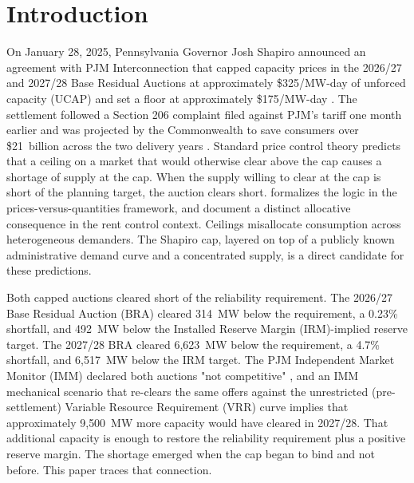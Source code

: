 
\section{Introduction}
\label{sec:introduction}

On January 28, 2025, Pennsylvania Governor Josh Shapiro announced an
agreement with PJM Interconnection that capped capacity prices in the
2026/27 and 2027/28 Base Residual Auctions at approximately
\$325/MW-day of unforced capacity (UCAP) and set a floor at
approximately \$175/MW-day \citep{Shapiro2025_press_release,
PJM2025_settlement_slides}. The settlement followed a Section 206
complaint filed against PJM's tariff one month earlier
\citep{PJM2025_settlement_slides} and was projected by the
Commonwealth to save consumers over \$21~billion across the two
delivery years \citep{Shapiro2025_press_release}. Standard price control theory predicts that a
ceiling on a market that would otherwise clear above the cap
causes a shortage of supply at the cap. When the supply willing to clear at the
cap is short of the planning target, the auction clears short.
\citet{Weitzman1974_prices} formalizes the logic in the
prices-versus-quantities framework, and
\citet{GlaeserLuttmer2003_rent} document a distinct allocative
consequence in the rent control context. Ceilings misallocate
consumption across heterogeneous demanders. The Shapiro cap,
layered on top of a publicly known administrative demand curve and a
concentrated supply, is a direct candidate for these predictions.

Both capped auctions cleared short of the reliability requirement.
The 2026/27 Base Residual Auction (BRA) cleared 314~MW below the
requirement, a 0.23\% shortfall, and 492~MW below the
Installed Reserve Margin (IRM)-implied reserve target. The
2027/28 BRA cleared 6{,}623~MW below the requirement, a 4.7\%
shortfall, and 6{,}517~MW below the IRM target. The PJM Independent
Market Monitor (IMM) declared both auctions "not competitive"
\citep{MonitoringAnalytics2025_sotm}, and an IMM mechanical scenario
that re-clears the same offers against the unrestricted
(pre-settlement) Variable Resource Requirement (VRR) curve implies
that approximately 9{,}500~MW more
capacity would have cleared in 2027/28. That additional capacity is
enough to restore the reliability requirement plus a positive reserve
margin. The shortage emerged when the cap began to bind and not
before. This paper traces that connection.
